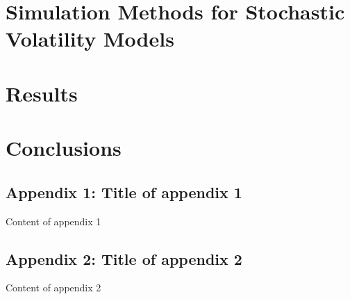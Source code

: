 \documentclass[12pt,a4paper,oneside]{report}
\begin{document}
\chapter{Simulation Methods for Stochastic Volatility Models}




\chapter{Results}




\chapter{Conclusions}



\newpage


\clearpage

\listoffigures
{}
\clearpage

\listoftables
{}
\clearpage

\begin{appendices}
    \section*{Appendix 1: Title of appendix 1}

    Content of appendix 1

    \section*{Appendix 2: Title of appendix 2}

    Content of appendix 2
\end{appendices}




\end{document}
